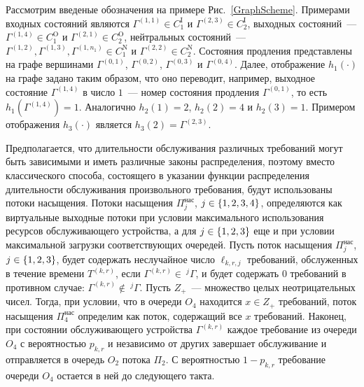 \documentclass[a4paper,12pt,russian]{extarticle}
\newcommand{\G}{\Gamma}
\newcommand{\ga}[1]{\Gamma^{\left( #1 \right)} }
\newcommand{\Tt}[1]{T^{\left( #1 \right)} }
\begin{document}
Рассмотрим введеные обозначения на примере Рис.~\ref{GraphScheme}. Примерами входных состояний являются $\ga{1,1} \in C_1^{\mathrm{I}}$ и $\ga{2,3} \in C_2^{\mathrm{I}}$, выходных состояний~--- $\ga{1,4} \in C_1^{\mathrm{O}}$ и $\ga{2,1} \in C_2^{\mathrm{O}}$, нейтральных состояний~--- $\ga{1,2}, \ga{1,3}, \ga{1,n_1} \in C_1^{\mathrm{N}}$ и $\ga{2,2} \in C_2^{\mathrm{N}}$. Состояния продления представлены на графе вершинами $\ga{0,1}$, $\ga{0,2}$, $\ga{0,3}$ и $\ga{0,4}$. Далее, отображение $h_1(\cdot)$ на графе задано таким образом, что оно переводит, например, выходное состояние $\ga{1,4}$ в число $1$~--- номер состояния продления $\ga{0,1}$, то есть $h_1(\ga{1,4})=1$. Аналогично $h_2(1)=2$, $h_2(2)=4$ и $h_2(3)=1$. Примером отображения $h_3(\cdot)$ является $h_3(2)=\ga{2,3}$.

Предполагается, что длительности обслуживания различных требований могут быть зависимыми и иметь различные законы распределения, поэтому вместо классического способа, состоящего в указании функции распределения длительности обслуживания произвольного требования, будут использованы потоки насыщения. Потоки насыщения $\Pi^{\mathrm{\text{нас}}}_j$, $j \in \left\{1,2,3,4\right\}$, определяются как виртуальные выходные потоки при 
условии максимального использования ресурсов обслуживающего устройства, а для $j\in \left\{1, 2, 3\right\}$ еще и при условии максимальной загрузки соответствующих очередей. 
Пусть поток насыщения $\Pi^{\mathrm{\text{нас}}}_j$, $j\in \left\{1,2,3\right\}$, будет содержать неслучайное число $\ell_{k,r,j}$ требований, обслуженных в течение времени $\Tt{k,r}$, если $\ga{k,r} \in~^j\G$, и будет содержать $0$ требований в противном случае: $\ga{k,r} \notin ~^j\G$. Пусть $Z_+$~--- множество целых неотрицательных чисел. Тогда, при условии, что в очереди $O_4$ находится $x \in Z_+$ требований, поток насыщения $\Pi^{\mathrm{\text{нас}}}_4$ определим как поток, содержащий все $x$ требований.
Наконец, при состоянии обслуживающего устройства $\ga{k,r}$ каждое требование из очереди $O_4$ с вероятностью $p_{k,r}$ и независимо от других завершает обслуживание и отправляется в очередь $O_2$ потока $\Pi_2$. С вероятностью $1-p_{k,r}$ требование очереди $O_4$ остается в ней до следующего такта.
\end{document}
